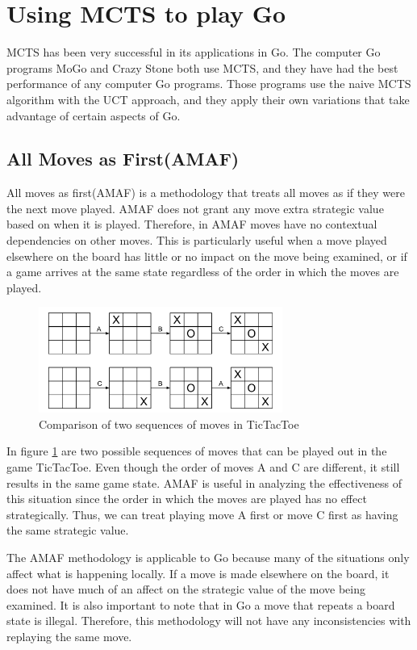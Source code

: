 \documentclass{sig-alternate}
\begin{document}
\section{Using MCTS to play Go}

MCTS has been very successful in its applications in Go. The computer Go programs MoGo and Crazy Stone both use MCTS, and they have had the best performance of any computer Go programs\cite{RAVEinGo}. Those programs use the naive MCTS algorithm with the UCT approach, and they apply their own variations that take advantage of certain aspects of Go.

\subsection{All Moves as First(AMAF)}
All moves as first(AMAF) is a methodology that treats all moves as if they were the next move played. AMAF does not grant any move extra strategic value based on when it is played. Therefore, in AMAF moves have no contextual dependencies on other moves. This is particularly useful when a move played elsewhere on the board has little or no impact on the move being examined, or if a game arrives at the same state regardless of the order in which the moves are played. 

\begin{figure}[h]
	\includegraphics[width=8cm]{MoveOrderNotMattering.pdf}
	\centering
	\caption{Comparison of two sequences of moves in TicTacToe}
	\label{fig:TwoSeq}
\end{figure}

In figure \ref{fig:TwoSeq} are two possible sequences of moves that can be played out in the game TicTacToe. Even though the order of moves A and C are different, it still results in the same game state. AMAF is useful in analyzing the effectiveness of this situation since the order in which the moves are played has no effect strategically. Thus, we can treat playing move A first or move C first as having the same strategic value.

The AMAF methodology is applicable to Go because many of the situations only affect what is happening locally. If a move is made elsewhere on the board, it does not have much of an affect on the strategic value of the move being examined. It is also important to note that in Go a move that repeats a board state is illegal. Therefore, this methodology will not have any inconsistencies with replaying the same move.
\end{document}

